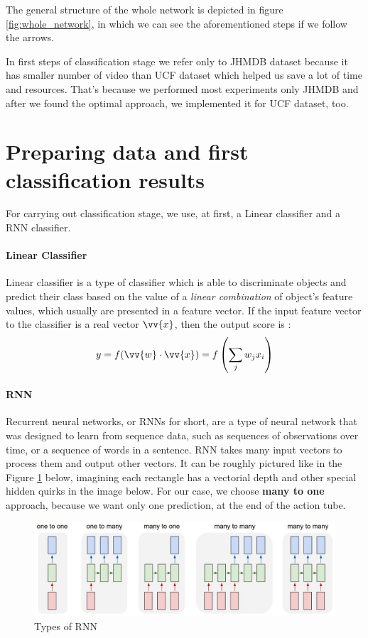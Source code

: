 \documentclass{report}
\begin{document}
The general structure of the whole network is depicted in figure \ref{fig:whole_network}, in which we can see the aforementioned steps if we
follow the arrows.  \par
In first steps of classification stage we refer only to JHMDB dataset because it has smaller number of video than UCF dataset which
helped us save a lot of time and resources. That's because  we performed most experiments only JHMDB and after we found the optimal
approach, we implemented it for  UCF dataset, too. 

\section{Preparing data  and first classification results}

For carrying out classification stage, we use, at first, a Linear classifier and a RNN classifier.
\paragraph{Linear Classifier} Linear classifier is a type of classifier which is able to discriminate objects and predict their
class based on the value of a \textit{linear combination} of object's feature values, which usually are presented in a feature
vector. If the input feature vector to the classifier is a real vector  $\vv{x}$, then the output score is :
\[ y = f(\vv{w} \cdot \vv{x}) = f \left( \sum_j w_jx_i \right) \]
\paragraph{RNN}
Recurrent neural networks, or RNNs for short, are a type of neural network that was designed to learn from sequence data,
such as sequences of observations over time, or a sequence of words in a sentence.
RNN takes many input vectors to process them and output other vectors.
It can be roughly pictured like in the Figure \ref{fig:rnn} below,
imagining each rectangle has a vectorial depth and other special hidden quirks in the image below.
For our case, we choose \textbf{many to one} approach, because we want only one prediction, at the end of
the action tube. \par
\begin{figure}[h]
  \centering
  \includegraphics[width=1.\textwidth]{rnn.jpeg}
  \caption{Types of RNN}
  \label{fig:rnn}
\end{figure}
\end{document}
